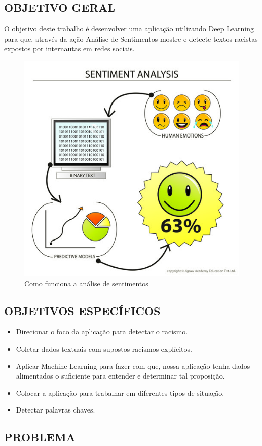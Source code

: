 \documentclass[12pt, a4paper]{article}
\begin{document}
\subsection{OBJETIVO GERAL}
\hspace*{0.8cm}O objetivo deste trabalho é desenvolver uma aplicação utilizando Deep Learning para que, através da ação Análise de Sentimentos mostre e detecte textos racistas expostos por internautas em redes sociais.

\begin{figure}[H]
\centering
\includegraphics[width=.55\textwidth]{como_funciona.jpg}
\caption{Como funciona a análise de sentimentos}
\label{fig:Fig1}
\end{figure}

\subsection{OBJETIVOS ESPECÍFICOS}
\begin{itemize}
\item Direcionar o foco da aplicação para detectar o racismo.
\item Coletar dados textuais com supostos racismos explícitos.
\item Aplicar Machine Learning para fazer com que, nossa aplicação tenha dados alimentados o suficiente para entender e determinar tal proposição.
\item Colocar a aplicação para trabalhar em diferentes tipos de situação.
\item Detectar palavras chaves.
\end{itemize}

\subsection{PROBLEMA}
\end{document}
